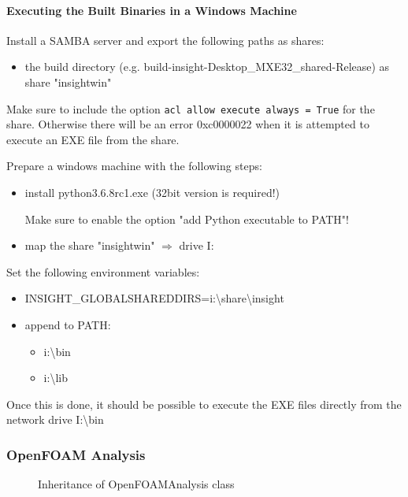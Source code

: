 \paragraph{Executing the Built Binaries in a Windows Machine}

Install a SAMBA server and export the following paths as shares:
\begin{itemize}
\item the build directory (e.g. build-insight-Desktop\_MXE32\_shared-Release) as share "insightwin"
\end{itemize}
Make sure to include the option \texttt{acl allow execute always = True} for the share.
Otherwise there will be an error 0xc0000022 when it is attempted to execute an EXE file from the share.\warningsymbol

Prepare a windows machine with the following steps:
\begin{itemize}
\item install python3.6.8rc1.exe (32bit version is required!)

Make sure to enable the option "add Python executable to PATH"! \warningsymbol

\item map the share "insightwin" $\Rightarrow$ drive I:
\end{itemize}

Set the following environment variables:
\begin{itemize}
\item INSIGHT\_GLOBALSHAREDDIRS=i:\textbackslash{}share\textbackslash{}insight
\item append to PATH: 
\begin{itemize}
\item i:\textbackslash{}bin
\item i:\textbackslash{}lib
\end{itemize}
\end{itemize}

Once this is done, it should be possible to execute the EXE files directly from the network drive I:\textbackslash{}bin

\subsubsection{OpenFOAM Analysis}


\begin{figure}[h!]
\centering
{}
\caption{Inheritance of OpenFOAMAnalysis class}
\label{fig:}
\end{figure}

